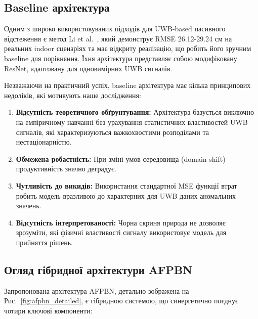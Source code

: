 \documentclass[12pt,a4paper]{article}
\begin{document}
\subsection{Baseline архітектура}
\label{sec:baseline_to_hybrid}


Одним з широко використовуваних підходів для UWB-based пасивного відстеження є метод Li et al.~\cite{li2021multi}, який демонструє RMSE 26.12-29.24 см на реальних indoor сценаріях та має відкриту реалізацію, що робить його зручним baseline для порівняння. Їхня архітектура представляє собою модифіковану ResNet, адаптовану для одновимірних UWB сигналів.

Незважаючи на практичний успіх, baseline архітектура має кілька принципових недоліків, які мотивують наше дослідження:

\begin{enumerate}
	\item \textbf{Відсутність теоретичного обґрунтування:} Архітектура базується виключно на емпіричному навчанні без урахування статистичних властивостей UWB сигналів, які характеризуються важкохвостими розподілами та нестаціонарністю.
	
	\item \textbf{Обмежена робастність:} При зміні умов середовища (domain shift) продуктивність значно деградує.
	
	\item \textbf{Чутливість до викидів:} Використання стандартної MSE функції втрат робить модель вразливою до характерних для UWB даних аномальних значень.
	
	\item \textbf{Відсутність інтерпретованості:} Чорна скриня природа не дозволяє зрозуміти, які фізичні властивості сигналу використовує модель для прийняття рішень.
\end{enumerate}

\subsection{Огляд гібридної архітектури AFPBN}
\label{sec:architecture_overview}

Запропонована архітектура AFPBN, детально зображена на Рис.~\ref{fig:afpbn_detailed}, є гібридною системою, що синергетично поєднує чотири ключові компоненти:
\end{document}
